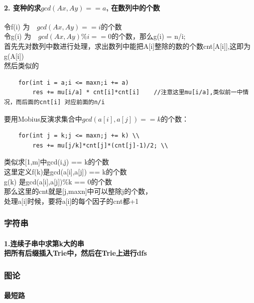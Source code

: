 \documentclass{article}
\begin{document}
\paragraph{2. 变种的求$gcd(Ax,Ay) == a$, 在数列中的个数\\}
	令f(i) 为　$gcd(Ax,Ay) == i$的个数 \\
令g(i) 为　$gcd(Ax,Ay) \% i == 0$的个数，那么g(i) = n/i; \\
首先先对数列中数进行处理，求出数列中能把A[i]整除的数的个数cnt[A[i]],这即为g(A[i]) \\
然后类似的 \\
\begin{lstlisting}
	for(int i = a;i <= maxn;i += a)
		res += mu[i/a] * cnt[i]*cnt[i]    //注意这里mu[i/a],类似前一中情况，而后面的cnt[i] 对应前面的n/i
\end{lstlisting}
要用Mobius反演求集合中$gcd(a[i],a[j]) == k$的个数： \\
\begin{lstlisting}
    for(int j = k;j <= maxn;j += k) \\
        res += mu[j/k]*cnt[j]*(cnt[j]-1)/2; \\
\end{lstlisting}
类似求[1,m]中gcd(i,j) == k的个数 \\
这里定义f(k)是gcd(a[i],a[j]) == k的个数 \\
g(k) 是gcd(a[i],a[j])\%k == 0的个数 \\
那么这里的cnt就是[j,maxn]中可以整除j的个数， \\
处理a[i]时候，要将a[i]的每个因子的cnt都+1

\subsubsection{字符串}
\paragraph{1.连续子串中求第k大的串\\ 把所有后缀插入Trie中，然后在Trie上进行dfs}

\subsubsection{图论}
\paragraph{最短路}
\end{document}
